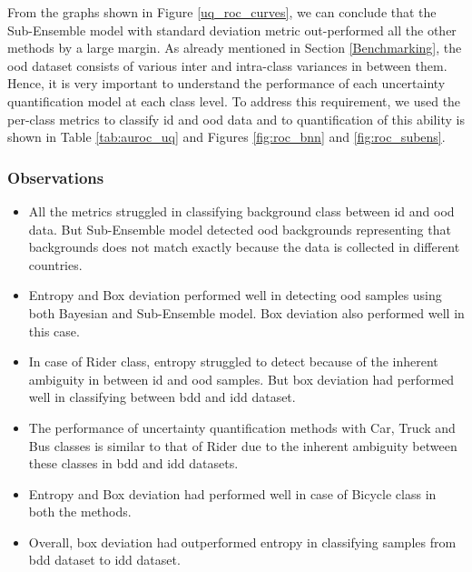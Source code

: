     From the graphs shown in Figure \ref{uq_roc_curves}, we can conclude that the Sub-Ensemble model with standard deviation metric out-performed all the other methods by a large margin.
    As already mentioned in Section \ref{Benchmarking}, the \acrshort{ood} dataset consists of various inter and intra-class variances in between them. Hence, it is very important to understand the performance of each uncertainty quantification model at each class level. To address this requirement, we used the per-class metrics to classify \acrshort{id} and \acrshort{ood} data and to quantification of this ability is shown in Table \ref{tab:auroc_uq} and Figures \ref{fig:roc_bnn} and \ref{fig:roc_subens}. 
    
    \subsubsection{Observations}
    \begin{itemize}
        \item All the metrics struggled in classifying background class between \acrshort{id} and \acrshort{ood} data. But Sub-Ensemble model detected \acrshort{ood} backgrounds representing that backgrounds does not match exactly because the data is collected in different countries.
        \item Entropy and Box deviation performed well in detecting \acrshort{ood} samples using both Bayesian and Sub-Ensemble model. Box deviation also performed well in this case.
        \item In case of Rider class, entropy struggled to detect because of the inherent ambiguity in between \acrshort{id} and \acrshort{ood} samples. But box deviation had performed well in classifying between \acrshort{bdd} and \acrshort{idd} dataset.
        \item The performance of uncertainty quantification methods with Car, Truck and Bus classes is similar to that of Rider due to the inherent ambiguity between these classes in \acrshort{bdd} and \acrshort{idd} datasets.
        \item Entropy and Box deviation had performed well in case of Bicycle class in both the methods.
        \item Overall, box deviation had outperformed entropy in classifying samples from \acrshort{bdd} dataset to \acrshort{idd} dataset.
    \end{itemize}
    
